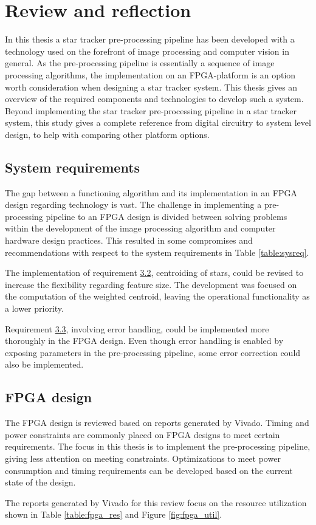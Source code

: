 \documentclass[12pt]{report}
\begin{document}
\chapter{Review and reflection}

In this thesis a star tracker pre-processing pipeline has been developed with a technology used on the forefront of image processing and computer vision in general. As the pre-processing pipeline is essentially a sequence of image processing algorithms, the implementation on an FPGA-platform is an option worth consideration when designing a star tracker system. This thesis gives an overview of the required components and technologies to develop such a system. Beyond implementing the star tracker pre-processing pipeline in a star tracker system, this study gives a complete reference from digital circuitry to system level design, to help with comparing other platform options. 
\par

\section{System requirements}
The gap between a functioning algorithm and its implementation in an FPGA design regarding technology is vast. The challenge in implementing a pre-processing pipeline to an FPGA design is divided between solving problems within the development of the image processing algorithm and computer hardware design practices. This resulted in some compromises and recommendations with respect to the system requirements in Table \ref*{table:sysreq}.
\par
The implementation of requirement \hyperref[req3.2]{3.2}, centroiding of stars, could be revised to increase the flexibility regarding feature size. The development was focused on the computation of the weighted centroid, leaving the operational functionality as a lower priority.
\par
Requirement \hyperref[req3.3]{3.3}, involving error handling, could be implemented more thoroughly in the FPGA design. Even though error handling is enabled by exposing parameters in the pre-processing pipeline, some error correction could also be implemented.
\par

\section{FPGA design}
The FPGA design is reviewed based on reports generated by Vivado. Timing and power constraints are commonly placed on FPGA designs to meet certain requirements. The focus in this thesis is to implement the pre-processing pipeline, giving less attention on meeting constraints. Optimizations to meet power consumption and timing requirements can be developed based on the current state of the design.
\par
The reports generated by Vivado for this review focus on the resource utilization shown in Table \ref*{table:fpga_res} and Figure \ref*{fig:fpga_util}.
\end{document}
